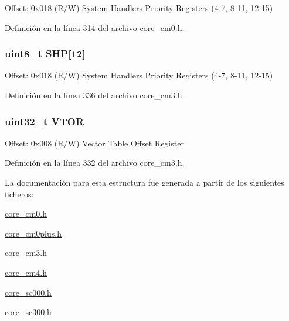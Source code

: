 Offset\+: 0x018 (R/W) System Handlers Priority Registers (4-\/7, 8-\/11, 12-\/15) 

Definición en la línea 314 del archivo core\+\_\+cm0.\+h.

\subsubsection[{\texorpdfstring{S\+HP}{SHP}}]{ uint8\+\_\+t S\+HP\mbox{[}12\mbox{]}}\hypertarget{struct_s_c_b___type_a17dc9f83c53cbf7fa249e79a2d2a43f8}{}\label{struct_s_c_b___type_a17dc9f83c53cbf7fa249e79a2d2a43f8}
Offset\+: 0x018 (R/W) System Handlers Priority Registers (4-\/7, 8-\/11, 12-\/15) 

Definición en la línea 336 del archivo core\+\_\+cm3.\+h.

\subsubsection[{\texorpdfstring{V\+T\+OR}{VTOR}}]{ uint32\+\_\+t V\+T\+OR}\hypertarget{struct_s_c_b___type_aaf388a921a016cae590cfcf1e43b1cdf}{}\label{struct_s_c_b___type_aaf388a921a016cae590cfcf1e43b1cdf}
Offset\+: 0x008 (R/W) Vector Table Offset Register 

Definición en la línea 332 del archivo core\+\_\+cm3.\+h.



La documentación para esta estructura fue generada a partir de los siguientes ficheros\+:\begin{DoxyCompactItemize}
\item 
\hyperlink{core__cm0_8h}{core\+\_\+cm0.\+h}\item 
\hyperlink{core__cm0plus_8h}{core\+\_\+cm0plus.\+h}\item 
\hyperlink{core__cm3_8h}{core\+\_\+cm3.\+h}\item 
\hyperlink{core__cm4_8h}{core\+\_\+cm4.\+h}\item 
\hyperlink{core__sc000_8h}{core\+\_\+sc000.\+h}\item 
\hyperlink{core__sc300_8h}{core\+\_\+sc300.\+h}\end{DoxyCompactItemize}
